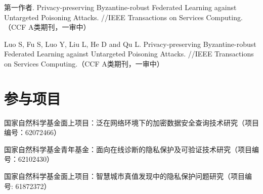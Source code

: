 \begin{resume}
\begin{enumerate}[label={[\arabic*]},itemsep=0pt,parsep=0pt,labelindent=26pt,labelwidth=*,leftmargin=0pt,itemindent=*,align=left]
	\ifisanon
	\item 第一作者. Privacy-preserving Byzantine-robust Federated Learning against Untargeted Poisoning Attacks. //IEEE Transactions on Services Computing.（CCF A类期刊，一审中）
	
	\else
	\item Luo S, Fu S, Luo Y, Liu L, He D and Qu L. Privacy-preserving Byzantine-robust Federated Learning against Untargeted Poisoning Attacks. //IEEE Transactions on Services Computing.（CCF A类期刊，一审中）
	
	\fi
	
	
\end{enumerate}

\iffalse
\section*{研究成果} %

\begin{enumerate}[label={[\arabic*]},itemsep=0pt,parsep=0pt,labelindent=26pt,labelwidth=*,leftmargin=0pt,itemindent=*,align=left]
	
	\item 专利：NI211283CN人员流动性的安全预测方法、系统、客户端设备及服务器（申请中）
	\item 专利：NI220234CN 基于契约的众包激励方法、系统、设备和存储介质（申请中）
\end{enumerate}
\fi

\section*{参与项目} %
\begin{enumerate}[label={[\arabic*]},itemsep=0pt,parsep=0pt,labelindent=26pt,labelwidth=*,leftmargin=0pt,itemindent=*,align=left]
	\item 国家自然科学基金面上项目：泛在网络环境下的加密数据安全查询技术研究（项目编号：62072466）
	\item 国家自然科学基金青年基金：面向在线诊断的隐私保护及可验证技术研究（项目编号：62102430）
	\item 国家自然科学基金面上项目：智慧城市真值发现中的隐私保护问题研究（项目编号: 61872372）
\end{enumerate}
\fi
\fi
\end{resume}
